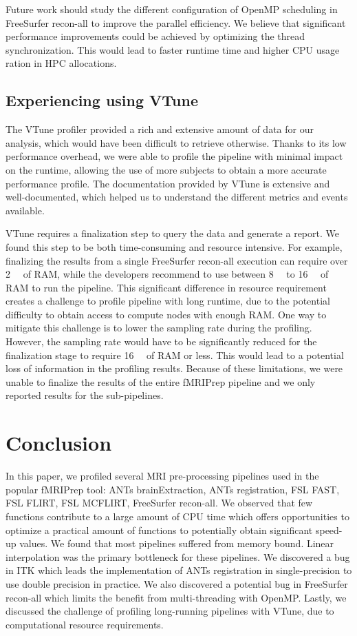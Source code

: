 \documentclass[conference]{IEEEtran}
\begin{document}
Future work should study the different configuration of OpenMP scheduling in FreeSurfer recon-all to improve the parallel efficiency. We believe that significant performance improvements could be achieved by optimizing the thread synchronization. This would lead to faster runtime time and higher CPU usage ration in HPC allocations.

\subsection{Experiencing using VTune}
The VTune profiler provided a rich and extensive amount of data for our analysis, which would have been difficult to retrieve otherwise. Thanks to its low performance overhead, we were able to profile the pipeline with minimal impact on the runtime, allowing the use of more subjects to obtain a more accurate performance profile. The documentation provided by VTune is extensive and well-documented, which helped us to understand the different metrics and events available.

VTune requires a finalization step to query the data and generate a report. We found this step to be both time-consuming and resource intensive. For example, finalizing the results from a single FreeSurfer recon-all execution can require over \SI{2}{\tera\byte} of RAM, while the developers recommend to use between \SI{8}{\giga\byte} to \SI{16}{\giga\byte} of RAM to run the pipeline. This significant difference in resource requirement creates a challenge to profile pipeline with long runtime, due to the potential difficulty to obtain access to compute nodes with enough RAM. One way to mitigate this challenge is to lower the sampling rate during the profiling. However, the sampling rate would have to be significantly reduced for the finalization stage to require  \SI{16}{\giga\byte} of RAM or less. This would lead to a potential loss of information in the profiling results.
Because of these limitations, we were unable to finalize the results of the entire fMRIPrep pipeline and we only reported results for the sub-pipelines.

\section{Conclusion}
In this paper, we profiled several MRI pre-processing pipelines used in the popular fMRIPrep tool: ANTs brainExtraction, ANTs registration, FSL FAST, FSL FLIRT, FSL MCFLIRT, FreeSurfer recon-all. We observed that few functions contribute to a large amount of CPU time which offers opportunities to optimize a practical amount of functions to potentially obtain significant speed-up values. We found that most pipelines suffered from memory bound. Linear interpolation was the primary bottleneck for these pipelines. We discovered a bug in ITK which leads the implementation of ANTs registration in single-precision to use double precision in practice. We also discovered a potential bug in FreeSurfer recon-all which limits the benefit from multi-threading with OpenMP. Lastly, we discussed the challenge of profiling long-running pipelines with VTune, due to computational resource requirements.
\end{document}
